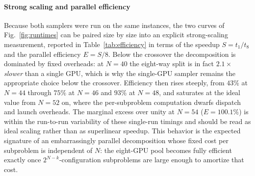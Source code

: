 \documentclass[preprint,12pt,a4paper]{elsarticle}
\begin{document}
\paragraph{Strong scaling and parallel efficiency}
Because both samplers were run on the same instances, the two curves of
Fig.~\ref{fig:runtimes} can be paired size by size into an explicit
strong-scaling measurement, reported in Table~\ref{tab:efficiency} in terms of
the speedup $S=t_1/t_8$ and the parallel efficiency $E=S/8$. Below the crossover
the decomposition is dominated by fixed overheads: at $N=40$ the eight-way split
is in fact $2.1\times$ \emph{slower} than a single GPU, which is why the
single-GPU sampler remains the appropriate choice below the crossover.
Efficiency then rises steeply, from $43\%$ at $N=44$ through $75\%$ at $N=46$ and
$93\%$ at $N=48$, and saturates at the ideal value from $N=52$ on, where the
per-subproblem computation dwarfs dispatch and launch overheads. The marginal
excess over unity at $N=54$ ($E=100.1\%$) is within the run-to-run variability of
these single-run timings and should be read as ideal scaling rather than as
superlinear speedup. This behavior is the expected signature of an
embarrassingly parallel decomposition whose fixed cost per subproblem is
independent of $N$: the eight-GPU pool becomes fully efficient exactly once
$2^{N-k}$-configuration subproblems are large enough to amortize that cost.
\end{document}
